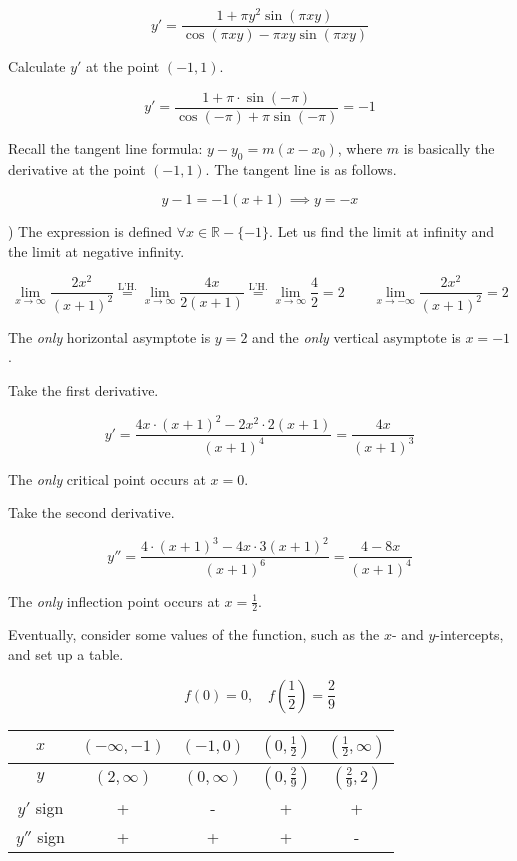 \documentclass{article}
\begin{document}
\[y'=\frac{1+\pi y^2\sin(\pi xy)}{\cos(\pi xy)-\pi xy\sin(\pi xy)}\]

\noindent Calculate $y'$ at the point $(-1,1)$.

\[y' = \frac{1+\pi\cdot\sin(-\pi)}{\cos(-\pi)+\pi\sin(-\pi)}=-1\]

\hfill

\noindent Recall the tangent line formula: $y-y_0=m(x-x_0)$, where $m$ is basically the derivative at the point $(-1,1)$. The tangent line is as follows.

\[y-1=-1(x+1)\implies\boxed{y=-x}\]

\newpage

) The expression is defined $\forall x\in \mathbb{R}- \{-1\}$. Let us find the limit at infinity and the limit at negative infinity.

\[\lim_{x\to\infty}\frac{2x^2}{(x+1)^2}\overset{\text{L'H.}}{=}\lim_{x\to\infty}\frac{4x}{2(x+1)}\overset{\text{L'H.}}{=}\lim_{x\to\infty}\frac42=2\quad\quad\lim_{x\to-\infty}\frac{2x^2}{(x+1)^2}=2\]

\hfill

\noindent The \textit{only} horizontal asymptote is $y=2$ and the \textit{only} vertical asymptote is $x=-1$.

\hfill 

\noindent Take the first derivative.

\[y'=\frac{4x\cdot(x+1)^2-2x^2\cdot2(x+1)}{(x+1)^4}=\frac{4x}{(x+1)^3}\]

\hfill

\noindent The \textit{only} critical point occurs at $x=0$.

\hfill 

\noindent Take the second derivative.

\[y''=\frac{4\cdot(x+1)^3-4x\cdot3(x+1)^2}{(x+1)^6}=\frac{4-8x}{(x+1)^4}\]

\hfill 

\noindent The \textit{only} inflection point occurs at $\displaystyle x=\frac12$.

\hfill 

\noindent Eventually, consider some values of the function, such as the $x$- and $y$-intercepts, and set up a table.

\[f(0) = 0, \quad f\left(\frac12\right)=\frac29\]

\begin{center}
    \large
    \begin{tabular}{ |c| c c c c| } 
    \hline
        $x$ & $(-\infty,-1)$ & $(-1,0)$ & $\left(0,\frac12\right)$ & $\left(\frac12,\infty\right)$ \\
        \hline
        $y$ & $(2,\infty)$ & $(0,\infty)$ & $\left(0,\frac29\right)$ & $\left(\frac29,2\right)$ \\
        \hline
        $y'$ sign & + & - & + & + \\
        \hline
        $y''$ sign & + & + & + & - \\
        \hline
    \end{tabular}
\end{center}
\end{document}
